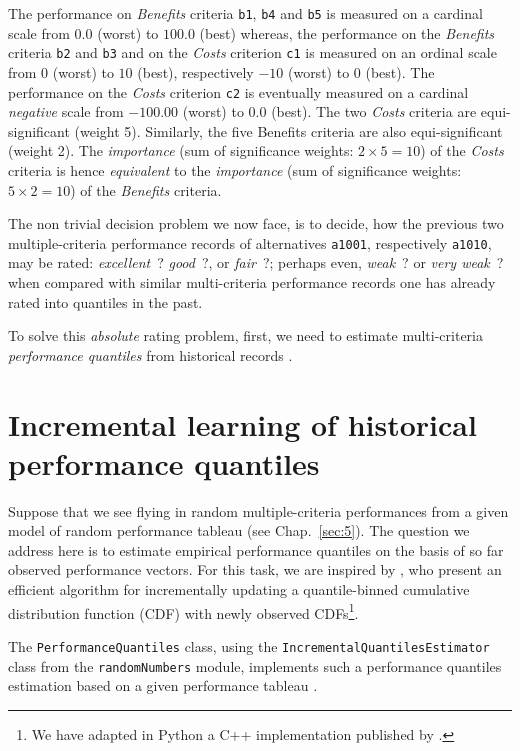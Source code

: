 The performance on \emph{Benefits} criteria \texttt{b1}, \texttt{b4} and \texttt{b5} is measured on a cardinal scale from $0.0$ (worst) to $100.0$ (best) whereas, the performance on the \emph{Benefits} criteria \texttt{b2} and \texttt{b3}  and on the \emph{Costs} criterion \texttt{c1} is measured on an ordinal scale from $0$ (worst) to $10$ (best), respectively $-10$ (worst) to $0$ (best). The performance on the \emph{Costs} criterion \texttt{c2} is eventually measured on a cardinal \emph{negative} scale from $-100.00$ (worst) to $0.0$ (best). The two \emph{Costs} criteria are equi-significant (weight 5). Similarly, the five Benefits criteria are also equi-significant (weight 2). The \emph{importance} (sum of significance weights: $2 \times 5 = 10$) of the \emph{Costs} criteria is hence \emph{equivalent} to the \emph{importance} (sum of significance weights: $5 \times 2 = 10$) of the \emph{Benefits} criteria.
   
The non trivial decision problem we now face, is to decide, how the previous two multiple-criteria performance records of alternatives \texttt{a1001}, respectively \texttt{a1010},  may be rated: \emph{excellent}~? \emph{good}~?, or \emph{fair}~?; perhaps even, \emph{weak}~? or \emph{very weak}~? when compared with similar multi-criteria performance records one has already rated into quantiles in the past. 

To solve this \emph{absolute} rating problem, first, we need to estimate multi-criteria \emph{performance quantiles} from historical records \citep{CPSTAT-L5}.  

\section{Incremental learning of historical performance quantiles}
\label{sec:10.2}

Suppose that we see flying in random multiple-criteria performances from a given model of random performance tableau (see Chap.~\ref{sec:5}). The question we address here is to estimate empirical performance quantiles on the basis of so far observed performance vectors. For this task, we are inspired by \citet*{CHAM-2006}, who present an efficient algorithm for incrementally updating a quantile-binned cumulative distribution function (CDF) with newly observed CDFs\footnote{We have adapted in Python a C++ implementation published by \citep*[Chapter 5]{NR3-2007}.}. 

The \texttt{PerformanceQuantiles} class, using the \texttt{IncrementalQuan\-tiles\-Estimator} class from the \texttt{randomNumbers} module, implements such a performance quantiles estimation based on a given performance tableau \citep{BIS-2021b}.


